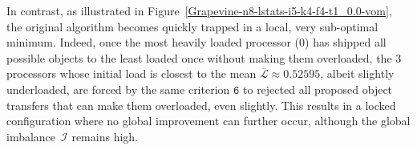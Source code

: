 In contrast, as illustrated in
Figure~\ref{Grapevine-n8-lstats-i5-k4-f4-t1_0.0-vom}, the original
algorithm becomes quickly trapped in a local, very sub-optimal minimum.
Indeed, once the most heavily loaded processor ($0$) has shipped all
possible objects to the least loaded once without making them
overloaded, the $3$ processors whose initial load is closest to the
mean $\overline{\mathcal{L}}\approx0.52595$, albeit slightly
underloaded, are forced by the same criterion $\texttt{6}$
to rejected all proposed object transfers that can make them
overloaded, even slightly.
This results in a locked configuration where no global improvement can
further occur, although the global imbalance~$\mathcal{I}$ remains
high.
